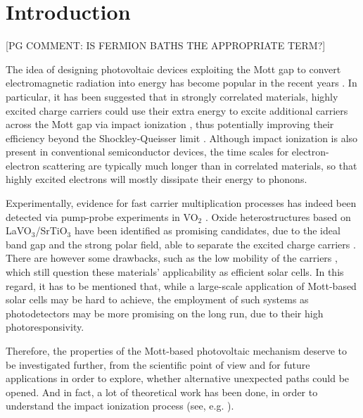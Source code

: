 \documentclass[aps,prb,groupedaddress,showpacs,twocolumn,superscriptaddress,10pt]{revtex4-2}
\newcommand{\pgcomm}[1]{{\color{ao(english)} [PG COMMENT: #1]}}
\begin{document}
\maketitle   


\section{Introduction} 
\label{sec:intro} 

\pgcomm{IS FERMION BATHS THE APPROPRIATE TERM?}
 
 
The idea of designing photovoltaic devices exploiting the Mott gap to convert electromagnetic radiation into energy has become popular in the recent years \cite{mano.10,li.ch.13,gu.gu.13,co.ma.14,wa.li.15}. In particular, it has been
suggested that in strongly correlated materials, highly excited charge carriers could use their extra energy to excite additional carriers across the Mott gap via impact ionization \cite{mano.10,co.ma.14}, thus
potentially improving their efficiency beyond the Shockley-Queisser limit \cite{sh.qu.61}. Although impact ionization is also present in conventional semiconductor devices, the time scales for electron-electron scattering are typically much longer than in correlated materials, so that highly excited electrons will mostly dissipate their energy to phonons. 

Experimentally, evidence for fast carrier multiplication processes has indeed been detected via pump-probe experiments in VO$_2$ \cite{ho.bi.16}. Oxide heterostructures based on LaVO$_3$/SrTiO$_3$ have been identified as promising candidates, due to the ideal band gap and the strong polar field, able to separate the excited charge carriers \cite{as.bl.13}. There are however some drawbacks, such as the low mobility of the carriers \cite{wa.li.15,je.re.18}, which still question these materials’ applicability as efficient solar cells. In this regard, it has to be mentioned that, while a large-scale application of Mott-based solar cells may be hard to achieve, the employment of such systems as photodetectors may be more promising on the long run, due to their high photoresponsivity. 

Therefore, the properties of the Mott-based photovoltaic mechanism deserve to be investigated further, from the scientific point of view and for future applications in order to explore, whether alternative unexpected paths could be opened. And in fact, a lot of theoretical work has been done, in order to understand the impact ionization process (see, e.g. \cite{co.ma.14,ec.we.11,ec.we.13,we.he.14,pe.be.19,so.do.18,ka.wo.20,ma.ev.22}). 
\end{document}
